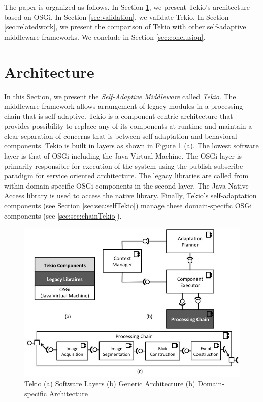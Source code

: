 \documentclass{acm_proc_article-sp}
\begin{document}
The paper is organized as follows.  In Section \ref{sec:architecture}, we present Tekio's architecture based on OSGi. In Section \ref{sec:validation}, we validate Tekio. In Section \ref{sec:relatedwork}, we present the comparison of Tekio with other self-adaptive middleware frameworks. We conclude in Section \ref{sec:conclusion}.



\section{Architecture}
\label{sec:architecture}

In this Section, we present the \emph{Self-Adaptive Middleware} called \emph{Tekio}.  The middleware framework allows arrangement of  legacy modules in a processing chain that is self-adaptive. Tekio is a component centric architecture  that provides possibility to replace any of its components at runtime and maintain a clear separation of concerns that is between self-adaptation and behavioral components. Tekio is built in layers as shown in Figure \ref{fig:tekioArch} (a). The lowest software layer is that of OSGi including the Java Virtual Machine. The OSGi layer is primarily responsible for execution of the system using the publish-subscribe paradigm for service oriented architecture. The legacy libraries are called from within domain-specific OSGi components in the second layer. The Java Native Access library is used to access the native library. Finally, Tekio's self-adaptation components (see Section \ref{sec:sec:selfTekio}) manage these domain-specific OSGi components (see \ref{sec:sec:chainTekio}). 



\begin{figure}
	\includegraphics[scale=0.3]{images/architecture.jpg}
	 \caption{Tekio (a) Software Layers (b) Generic Architecture (b) Domain-specific Architecture}
	 \label{fig:tekioArch} 
\end{figure}
\end{document}
